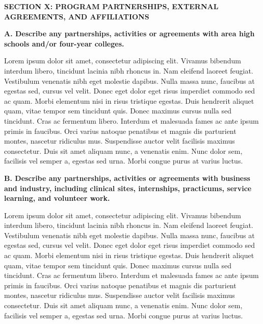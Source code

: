 \textbf{SECTION X: PROGRAM PARTNERSHIPS, EXTERNAL AGREEMENTS, AND AFFILIATIONS}


\textbf{A. Describe any partnerships, activities or agreements with area high schools and/or four-year colleges.}

Lorem ipsum dolor sit amet, consectetur adipiscing elit. Vivamus bibendum interdum libero, tincidunt lacinia nibh rhoncus in. Nam eleifend laoreet feugiat. Vestibulum venenatis nibh eget molestie dapibus. Nulla massa nunc, faucibus at egestas sed, cursus vel velit. Donec eget dolor eget risus imperdiet commodo sed ac quam. Morbi elementum nisi in risus tristique egestas. Duis hendrerit aliquet quam, vitae tempor sem tincidunt quis. Donec maximus cursus nulla sed tincidunt. Cras ac fermentum libero. Interdum et malesuada fames ac ante ipsum primis in faucibus. Orci varius natoque penatibus et magnis dis parturient montes, nascetur ridiculus mus. Suspendisse auctor velit facilisis maximus consectetur. Duis sit amet aliquam nunc, a venenatis enim. Nunc dolor sem, facilisis vel semper a, egestas sed urna. Morbi congue purus at varius luctus. 


\textbf{B. Describe any partnerships, activities or agreements with business and industry, including clinical sites, internships, practicums, service learning, and volunteer work.}

Lorem ipsum dolor sit amet, consectetur adipiscing elit. Vivamus bibendum interdum libero, tincidunt lacinia nibh rhoncus in. Nam eleifend laoreet feugiat. Vestibulum venenatis nibh eget molestie dapibus. Nulla massa nunc, faucibus at egestas sed, cursus vel velit. Donec eget dolor eget risus imperdiet commodo sed ac quam. Morbi elementum nisi in risus tristique egestas. Duis hendrerit aliquet quam, vitae tempor sem tincidunt quis. Donec maximus cursus nulla sed tincidunt. Cras ac fermentum libero. Interdum et malesuada fames ac ante ipsum primis in faucibus. Orci varius natoque penatibus et magnis dis parturient montes, nascetur ridiculus mus. Suspendisse auctor velit facilisis maximus consectetur. Duis sit amet aliquam nunc, a venenatis enim. Nunc dolor sem, facilisis vel semper a, egestas sed urna. Morbi congue purus at varius luctus. 
